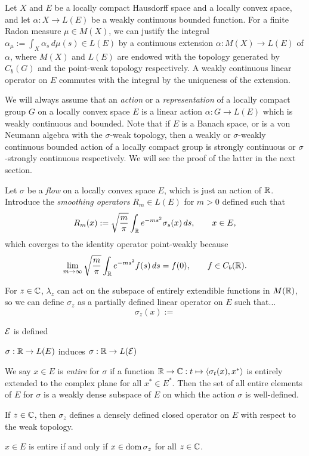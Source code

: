 \documentclass{../../large}
\begin{document}
\begin{prb}[Flows]
Let $X$ and $E$ be a locally compact Hausdorff space and a locally convex space, and let $\alpha:X\to L(E)$ be a weakly continuous bounded function.
For a finite Radon measure $\mu\in M(X)$, we can justify the integral $\alpha_\mu:=\int_X\alpha_s\,d\mu(s)\in L(E)$ by a continuous extension $\alpha:M(X)\to L(E)$ of $\alpha$, where $M(X)$ and $L(E)$ are endowed with the topology generated by $C_b(G)$ and the point-weak topology respectively.
A weakly continuous linear operator on $E$ commutes with the integral by the uniqueness of the extension.

We will always assume that an \emph{action} or a \emph{representation} of a locally compact group $G$ on a locally convex space $E$ is a linear action $\alpha:G\to L(E)$ which is weakly continuous and bounded.
Note that if $E$ is a Banach space, or is a von Neumann algebra with the $\sigma$-weak topology, then a weakly or $\sigma$-weakly continuous bounded action of a locally compact group is strongly continuous or $\sigma$-strongly continuous respectively.
We will see the proof of the latter in the next section.

Let $\sigma$ be a \emph{flow} on a locally convex space $E$, which is just an action of $\mathbb{R}$.
Introduce the \emph{smoothing operators} $R_m\in L(E)$ for $m>0$ defined such that
\[R_m(x):=\sqrt{\frac m\pi}\int_{\mathbb{R}} e^{-ms^2}\sigma_s(x)\,ds,\qquad x\in E,\]
which coverges to the identity operator point-weakly because
\[\lim_{m\to\infty}\sqrt{\frac m\pi}\int_{\mathbb{R}} e^{-ms^2}f(s)\,ds=f(0),\qquad f\in C_b(\mathbb{R}).\]

For $z\in\mathbb{C}$, $\lambda_z$ can act on the subspace of entirely extendible functions in $M(\mathbb{R})$, so we can define $\sigma_z$ as a partially defined linear operator on $E$ such that...
\[\sigma_z(x):=\]


$\mathcal{E}$ is defined 

$\sigma:\mathbb{R}\to L(E)$ induces $\sigma:\mathbb{R}\to L(\mathcal{E})$


We say $x\in E$ is \emph{entire} for $\sigma$ if a function $\mathbb{R}\to\mathbb{C}:t\mapsto\langle\sigma_t(x),x^*\rangle$ is entirely extended to the complex plane for all $x^*\in E^*$.
Then the set of all entire elements of $E$ for $\sigma$ is a weakly dense subspace of $E$ on which the action $\sigma$ is well-defined.

\begin{parts}
\item If $z\in\mathbb{C}$, then $\sigma_z$ defines a densely defined closed operator on $E$ with respect to the weak topology.
\item $x\in E$ is entire if and only if $x\in\operatorname{dom}\sigma_z$ for all $z\in\mathbb{C}$.
\end{parts}
\end{prb}
\end{document}
